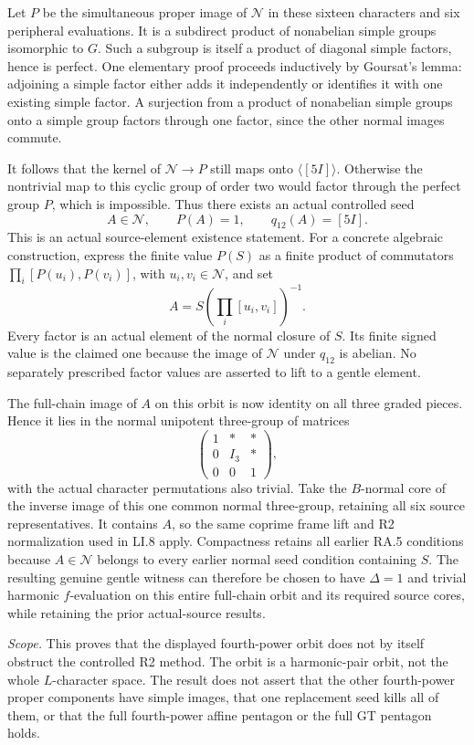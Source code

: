 Let $P$ be the simultaneous proper image of
$\mathcal N$ in these sixteen characters and six
peripheral evaluations.  It is a subdirect product
of nonabelian simple groups isomorphic to $G$.
Such a subgroup is itself a product of diagonal
simple factors, hence is perfect.  One elementary
proof proceeds inductively by Goursat's lemma:
adjoining a simple factor either adds it independently
or identifies it with one existing simple factor.
A surjection from a product of nonabelian simple
groups onto a simple group factors through one
factor, since the other normal images commute.

It follows that the kernel of
$\mathcal N\to P$ still maps onto
$\langle[5I]\rangle$.  Otherwise the nontrivial
map to this cyclic group of order two would factor
through the perfect group $P$, which is impossible.
Thus there exists an actual controlled seed
\[
 A\in\mathcal N,\qquad P(A)=1,
 \qquad q_{12}(A)=[5I].
\]
This is an actual source-element existence statement.
For a concrete algebraic construction, express the
finite value $P(S)$ as a finite product of commutators
$\prod_i[P(u_i),P(v_i)]$, with $u_i,v_i\in\mathcal N$,
and set
\[
                A=S\left(\prod_i[u_i,v_i]\right)^{-1}.
\]
Every factor is an actual element of the normal closure
of $S$.  Its finite signed value is the claimed one
because the image of $\mathcal N$ under $q_{12}$ is
abelian.  No separately prescribed factor values are
asserted to lift to a gentle element.

The full-chain image of $A$ on this orbit is now
identity on all three graded pieces.  Hence it lies
in the normal unipotent three-group of matrices
\[
 \begin{pmatrix}
  1&*&*\\0&I_3&*\\0&0&1
 \end{pmatrix},
\]
with the actual character permutations also trivial.
Take the $B$-normal core of the inverse image of this
one common normal three-group, retaining all six
source representatives.  It contains $A$, so the
same coprime frame lift and R2 normalization used in
LI.8 apply.  Compactness retains all earlier RA.5
conditions because $A\in\mathcal N$ belongs to every
earlier normal seed condition containing $S$.
The resulting genuine gentle witness can therefore
be chosen to have $\Delta=1$ and trivial harmonic
$f$-evaluation on this entire full-chain orbit and
its required source cores, while retaining the prior
actual-source results.

\emph{Scope.}  This proves that the displayed
fourth-power orbit does not by itself obstruct the
controlled R2 method.  The orbit is a harmonic-pair
orbit, not the whole $L$-character space.  The result
does not assert that the other fourth-power proper
components have simple images, that one replacement
seed kills all of them, or that the full fourth-power
affine pentagon or the full GT pentagon holds.
